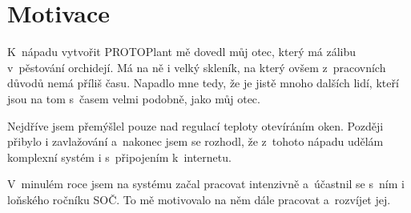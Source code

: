 \chapter{Motivace}
K~nápadu vytvořit  PROTOPlant mě dovedl můj otec, který má zálibu v~pěs\-to\-vá\-ní orchidejí.
Má na ně i velký skleník, na který ovšem z~pracovních důvodů nemá příliš času.
Napadlo mne tedy, že je jistě mnoho dalších lidí, kteří jsou na tom s~časem velmi podobně, jako můj otec.

Nejdříve jsem přemýšlel pouze nad regulací teploty otevíráním oken.
Později přibylo i zavlažování a~nakonec jsem se rozhodl, že z~tohoto nápadu udělám komplexní systém i s~připojením k~internetu.

V~minulém roce jsem na systému začal pracovat intenzivně a~účastnil se s~ním i loňského ročníku SOČ.
To mě motivovalo na něm dále pracovat a~rozvíjet jej.

\newpage